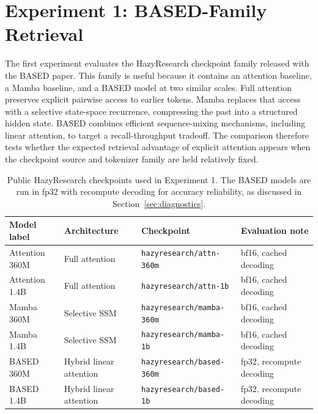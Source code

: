 \documentclass[10pt]{article}
\begin{document}
\section{Experiment 1: BASED-Family Retrieval}

The first experiment evaluates the HazyResearch checkpoint family released
with the BASED paper. This family is useful because it contains an attention
baseline, a Mamba baseline, and a BASED model at two similar scales. Full
attention preserves explicit pairwise access to earlier tokens. Mamba replaces
that access with a selective state-space recurrence, compressing the past into
a structured hidden state. BASED combines efficient sequence-mixing mechanisms,
including linear attention, to target a recall-throughput tradeoff. The
comparison therefore tests whether the expected retrieval advantage of explicit
attention appears when the checkpoint source and tokenizer family are held
relatively fixed.

\begin{table}[H]
\centering
\small
\setlength{\tabcolsep}{4pt}
\renewcommand{\arraystretch}{1.12}
\begin{tabularx}{\textwidth}{
>{\raggedright\arraybackslash}p{2.4cm}
>{\raggedright\arraybackslash}p{2.4cm}
>{\raggedright\arraybackslash}X
>{\raggedright\arraybackslash}p{2.7cm}}
\toprule
\textbf{Model label} &
\textbf{Architecture} &
\textbf{Checkpoint} &
\textbf{Evaluation note} \\
\midrule
Attention 360M & Full attention & \texttt{hazyresearch/attn-360m} &
bf16, cached decoding \\
Attention 1.4B & Full attention & \texttt{hazyresearch/attn-1b} &
bf16, cached decoding \\
Mamba 360M & Selective SSM & \texttt{hazyresearch/mamba-360m} &
bf16, cached decoding \\
Mamba 1.4B & Selective SSM & \texttt{hazyresearch/mamba-1b} &
bf16, cached decoding \\
BASED 360M & Hybrid linear attention & \texttt{hazyresearch/based-360m} &
fp32, recompute decoding \\
BASED 1.4B & Hybrid linear attention & \texttt{hazyresearch/based-1b} &
fp32, recompute decoding \\
\bottomrule
\end{tabularx}
\caption{Public HazyResearch checkpoints used in Experiment 1. The BASED
models are run in fp32 with recompute decoding for accuracy reliability, as
discussed in Section~\ref{sec:diagnostics}.}
\label{tab:experimental-models}
\end{table}
\end{document}
